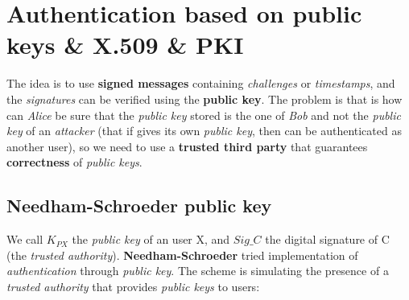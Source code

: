 \documentclass{article}
\begin{document}
\section{Authentication based on public keys \& X.509 \& PKI}
The idea is to use \textbf{signed messages} containing \emph{challenges} or \emph{timestamps}, and the \emph{signatures} can be verified using the \textbf{public key}. The problem is that is how can \emph{Alice} be sure that the \emph{public key} stored is the one of \emph{Bob} and not the \emph{public key} of an \emph{attacker} (that if gives its own \emph{public key}, then can be authenticated as another user), so we need to use a \textbf{trusted third party} that guarantees \textbf{correctness} of \emph{public keys}. 
\subsection{Needham-Schroeder public key}
We call $K_{PX}$ the \emph{public key} of an user X, and $Sig\_C$ the digital signature of C (the \emph{trusted authority}). \textbf{Needham-Schroeder} tried implementation of \emph{authentication} through \emph{public key}. The scheme is simulating the presence of a \emph{trusted authority} that provides \emph{public keys} to users:
\end{document}
